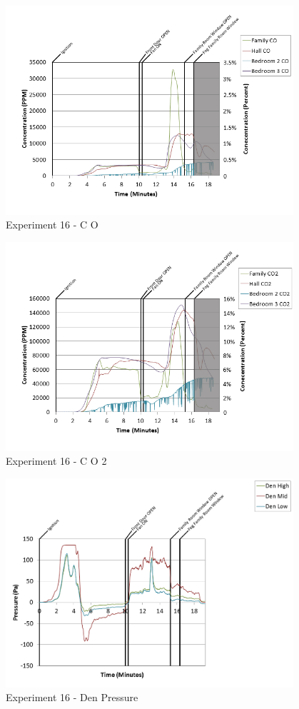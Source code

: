 \documentclass{article}
\begin{document}
\begin{appendices}
\clearpage

\begin{figure}[h!]
	\centering
	\includegraphics[height=3.05in]{0_Images/Results_Charts/Exp_16_Charts/CO.png}
	\caption{Experiment 16 - C O}
\end{figure}


\begin{figure}[h!]
	\centering
	\includegraphics[height=3.05in]{0_Images/Results_Charts/Exp_16_Charts/CO2.png}
	\caption{Experiment 16 - C O 2}
\end{figure}

\clearpage

\begin{figure}[h!]
	\centering
	\includegraphics[height=3.05in]{0_Images/Results_Charts/Exp_16_Charts/DenPressure.png}
	\caption{Experiment 16 - Den Pressure}
\end{figure}



\end{appendices}
\end{document}
